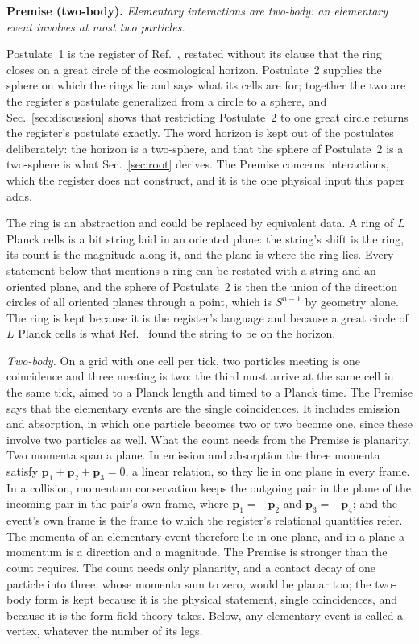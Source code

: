 \documentclass[aps,prd,twocolumn,superscriptaddress,nofootinbib]{revtex4-2}
\begin{document}
\textbf{Premise (two-body).} \emph{Elementary interactions are two-body: an elementary event involves at most two particles.}

Postulate~1 is the register of Ref.~\cite{korytko2026c}, restated without its clause that the ring closes on a great circle of the cosmological horizon. Postulate~2 supplies the sphere on which the rings lie and says what its cells are for; together the two are the register's postulate generalized from a circle to a sphere, and Sec.~\ref{sec:discussion} shows that restricting Postulate~2 to one great circle returns the register's postulate exactly. The word horizon is kept out of the postulates deliberately: the horizon is a two-sphere, and that the sphere of Postulate~2 is a two-sphere is what Sec.~\ref{sec:root} derives. The Premise concerns interactions, which the register does not construct, and it is the one physical input this paper adds.

The ring is an abstraction and could be replaced by equivalent data. A ring of $L$ Planck cells is a bit string laid in an oriented plane: the string's shift is the ring, its count is the magnitude along it, and the plane is where the ring lies. Every statement below that mentions a ring can be restated with a string and an oriented plane, and the sphere of Postulate~2 is then the union of the direction circles of all oriented planes through a point, which is $S^{n-1}$ by geometry alone. The ring is kept because it is the register's language and because a great circle of $L$ Planck cells is what Ref.~\cite{korytko2026c} found the string to be on the horizon.

\textit{Two-body.} On a grid with one cell per tick, two particles meeting is one coincidence and three meeting is two: the third must arrive at the same cell in the same tick, aimed to a Planck length and timed to a Planck time. The Premise says that the elementary events are the single coincidences. It includes emission and absorption, in which one particle becomes two or two become one, since these involve two particles as well. What the count needs from the Premise is planarity. Two momenta span a plane. In emission and absorption the three momenta satisfy $\mathbf{p}_1+\mathbf{p}_2+\mathbf{p}_3 = 0$, a linear relation, so they lie in one plane in every frame. In a collision, momentum conservation keeps the outgoing pair in the plane of the incoming pair in the pair's own frame, where $\mathbf{p}_1 = -\mathbf{p}_2$ and $\mathbf{p}_3 = -\mathbf{p}_4$; and the event's own frame is the frame to which the register's relational quantities refer. The momenta of an elementary event therefore lie in one plane, and in a plane a momentum is a direction and a magnitude. The Premise is stronger than the count requires. The count needs only planarity, and a contact decay of one particle into three, whose momenta sum to zero, would be planar too; the two-body form is kept because it is the physical statement, single coincidences, and because it is the form field theory takes. Below, any elementary event is called a vertex, whatever the number of its legs.
\end{document}
